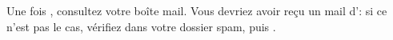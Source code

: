 ﻿Une fois , consultez votre boîte mail.
Vous devriez avoir reçu un mail d'\eDevoir : si ce n'est pas le cas, vérifiez dans votre dossier spam, puis .